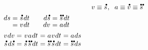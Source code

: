 \begin{alignat*}{2}
\hspace*{5em}
&& v \equiv \mathdotabove{s}
\hspace{.1ex} , \hspace{.6em}
a \equiv \mathdotabove{v} \equiv \mathdotdotabove{s}
\\
& \begin{array}{r@{\hspace{.3em}}c@{\hspace{.3em}}l}
   ds & = & \mathdotabove{s} \hspace{.2ex} dt
   \\[-0.2em]
   & = & v \hspace{.1ex} dt
\end{array}
\hspace{1em}
\begin{array}{r@{\hspace{.3em}}c@{\hspace{.3em}}l}
   d \mathdotabove{s} & = & \mathdotdotabove{s} \hspace{.3ex} dt
   \\[-0.2em]
   dv & = & a \hspace{.1ex} dt
\end{array}
\\
& \begin{array}{r@{\hspace{.3em}}c@{\hspace{.3em}}c@{\hspace{.3em}}c@{\hspace{.3em}}c@{\hspace{.3em}}c@{\hspace{.3em}}l}
v \hspace{.1ex} dv & = & v \hspace{.1ex} a \hspace{.1ex} dt & = & a \hspace{.1ex} v \hspace{.1ex} dt & = & a \hspace{.1ex} ds
\\
\mathdotabove{s} \hspace{.2ex} d \mathdotabove{s} & = & \mathdotabove{s} \hspace{.3ex} \mathdotdotabove{s} \hspace{.3ex} dt & = & \mathdotdotabove{s} \hspace{.3ex} \mathdotabove{s} \hspace{.2ex} dt & = & \mathdotdotabove{s} \hspace{.2ex} ds
\end{array}
\end{alignat*}

